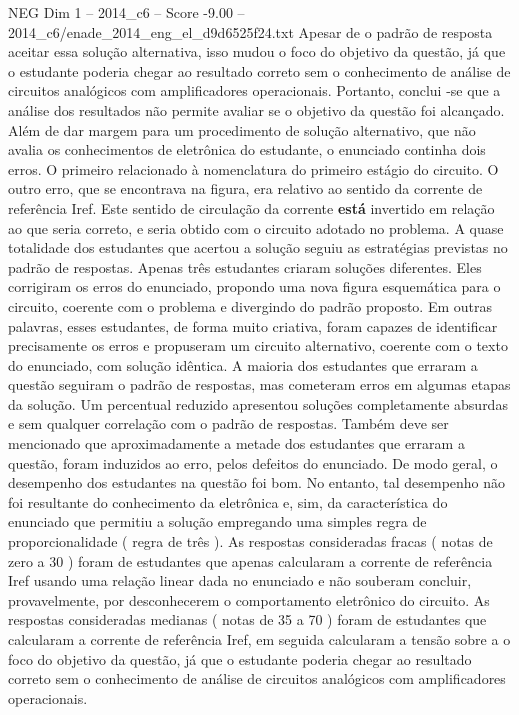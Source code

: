 \begin{textsample}{NEG Dim 1 – 2014\_c6 – Score -9.00 – 2014\_c6/enade\_2014\_eng\_el\_d9d6525f24.txt}
Apesar de o padrão de resposta aceitar essa solução alternativa, isso mudou o foco do objetivo da questão, já que o estudante poderia chegar ao resultado correto sem o conhecimento de análise de circuitos analógicos com amplificadores operacionais.
Portanto, conclui -se que a análise dos resultados não permite avaliar se o objetivo da questão foi alcançado.
Além de dar margem para um procedimento de solução alternativo, que não avalia os conhecimentos de eletrônica do estudante, o enunciado continha dois erros.
O primeiro relacionado à nomenclatura do primeiro estágio do circuito.
O outro erro, que se encontrava na figura, era relativo ao sentido da corrente de referência Iref.
Este sentido de circulação da corrente \textbf{está} invertido em relação ao que seria correto, e seria obtido com o circuito adotado no problema.
A quase totalidade dos estudantes que acertou a solução seguiu as estratégias previstas no padrão de respostas.
Apenas três estudantes criaram soluções diferentes.
Eles corrigiram os erros do enunciado, propondo uma nova figura esquemática para o circuito, coerente com o problema e divergindo do padrão proposto.
Em outras palavras, esses estudantes, de forma muito criativa, foram capazes de identificar precisamente os erros e propuseram um circuito alternativo, coerente com o texto do enunciado, com solução idêntica.
A maioria dos estudantes que erraram a questão seguiram o padrão de respostas, mas cometeram erros em algumas etapas da solução.
Um percentual reduzido apresentou soluções completamente absurdas e sem qualquer correlação com o padrão de respostas.
Também deve ser mencionado que aproximadamente a metade dos estudantes que erraram a questão, foram induzidos ao erro, pelos defeitos do enunciado.
De modo geral, o desempenho dos estudantes na questão foi bom.
No entanto, tal desempenho não foi resultante do conhecimento da eletrônica e, sim, da característica do enunciado que permitiu a solução empregando uma simples regra de proporcionalidade ( regra de três ).
As respostas consideradas fracas ( notas de zero a 30 ) foram de estudantes que apenas calcularam a corrente de referência Iref usando uma relação linear dada no enunciado e não souberam concluir, provavelmente, por desconhecerem o comportamento eletrônico do circuito.
As respostas consideradas medianas ( notas de 35 a 70 ) foram de estudantes que calcularam a corrente de referência Iref, em seguida calcularam a tensão sobre a o foco do objetivo da questão, já que o estudante poderia chegar ao resultado correto sem o conhecimento de análise de circuitos analógicos com amplificadores operacionais.

\end{textsample}
